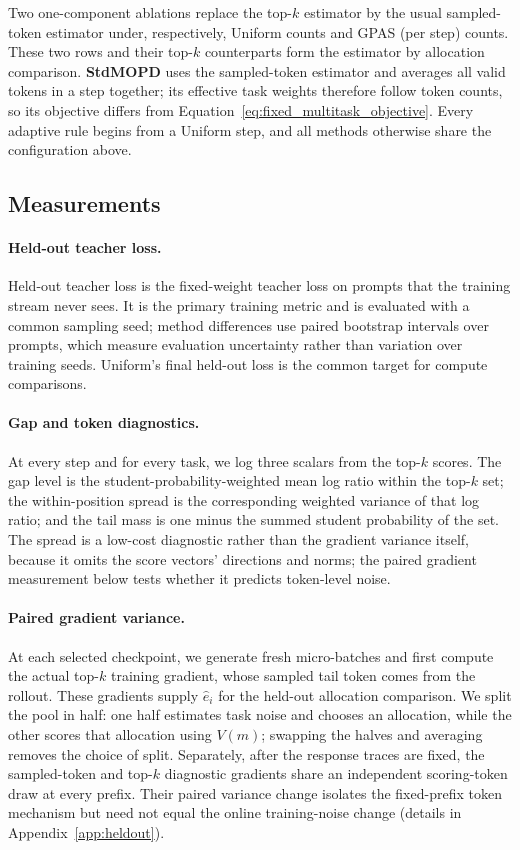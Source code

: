 Two one-component ablations replace the top-$k$ estimator by the usual
sampled-token estimator under, respectively, Uniform counts and GPAS (per
step) counts. These two rows and their top-$k$ counterparts form the estimator
by allocation comparison. \textbf{StdMOPD} uses the sampled-token estimator
and averages all valid tokens in a step together; its effective task weights
therefore follow token counts, so its objective differs from
Equation~\ref{eq:fixed_multitask_objective}. Every adaptive rule begins from a
Uniform step, and all methods otherwise share the configuration above.

\subsection{Measurements}

\paragraph{Held-out teacher loss.}
Held-out teacher loss is the fixed-weight teacher loss on prompts that the
training stream never sees. It is the primary training metric and is evaluated
with a common sampling seed; method differences use paired bootstrap intervals
over prompts, which measure evaluation uncertainty rather than variation over
training seeds. Uniform's final held-out loss is the common target for compute
comparisons.

\paragraph{Gap and token diagnostics.}
At every step and for every task, we log three scalars from the top-$k$ scores.
The gap level is the student-probability-weighted mean log ratio within the
top-$k$ set; the within-position spread is the corresponding weighted variance
of that log ratio; and the tail mass is one minus the summed student probability
of the set. The spread is a low-cost diagnostic rather than the gradient
variance itself, because it omits the score vectors' directions and norms; the
paired gradient measurement below tests whether it predicts token-level noise.

\paragraph{Paired gradient variance.}
At each selected checkpoint, we generate fresh micro-batches and first compute
the actual top-$k$ training gradient, whose sampled tail token comes from the
rollout. These gradients supply $\widehat e_i$ for the held-out allocation
comparison. We split the pool in half: one half estimates task noise and
chooses an allocation, while the other scores that allocation using $V(m)$;
swapping the halves and averaging removes the choice of split. Separately,
after the response traces are fixed, the sampled-token and top-$k$ diagnostic
gradients share an independent scoring-token draw at every prefix. Their paired
variance change isolates the fixed-prefix token mechanism but need not equal
the online training-noise change (details in Appendix~\ref{app:heldout}).

